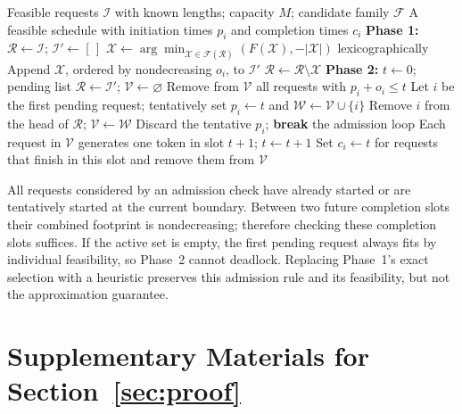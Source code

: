 \documentclass[nonblindrev]{informs3_hide}
\newcommand{\sortF}{\texttt{Sorted-F}}
\begin{document}
\begin{algorithm}[htbp]
\caption{\sortF: exact batch selection and ordered admission}
\label{algorithm_1}
\begin{algorithmic}[1]
\Require Feasible requests $\mathcal I$ with known lengths; capacity $M$; candidate family $\mathcal F$
\Ensure A feasible schedule with initiation times $p_i$ and completion times $c_i$
\State \textbf{Phase 1:} $\mathcal R\gets\mathcal I$; $\mathcal I'\gets[\,]$
  \State $\mathcal X\gets\arg\min_{\mathcal X\in\mathcal F(\mathcal R)}(F(\mathcal X),-|\mathcal X|)$ lexicographically
  \State Append $\mathcal X$, ordered by nondecreasing $o_i$, to $\mathcal I'$
  \State $\mathcal R\gets\mathcal R\setminus\mathcal X$
\EndWhile
\State \textbf{Phase 2:} $t\gets0$; pending list $\mathcal R\gets\mathcal I'$; $\mathcal V\gets\varnothing$
  \State Remove from $\mathcal V$ all requests with $p_i+o_i\le t$
    \State Let $i$ be the first pending request; tentatively set $p_i\gets t$ and $\mathcal W\gets\mathcal V\cup\{i\}$
      \State Remove $i$ from the head of $\mathcal R$; $\mathcal V\gets\mathcal W$
    \Else
      \State Discard the tentative $p_i$; \textbf{break} the admission loop
    \EndIf
  \EndWhile
  \State Each request in $\mathcal V$ generates one token in slot $t+1$; $t\gets t+1$
  \State Set $c_i\gets t$ for requests that finish in this slot and remove them from $\mathcal V$
\EndWhile
\end{algorithmic}
\end{algorithm}

All requests considered by an admission check have already
started or are tentatively started at the current boundary. Between two
future completion slots their combined footprint is nondecreasing;
therefore checking these completion slots suffices. If the active set is
empty, the first pending request always fits by individual feasibility,
so Phase~2 cannot deadlock. Replacing Phase~1's exact selection with a
heuristic preserves this admission rule and its feasibility, but not the
approximation guarantee.



\section{Supplementary Materials for Section~\ref{sec:proof}}
\label{append:proof}
\end{document}
